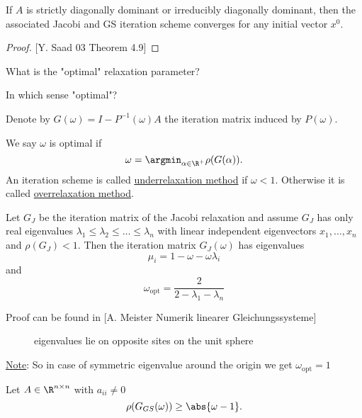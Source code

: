 \begin{theorem}
\label{thm:theorem2.3}
	If $A$ is strictly diagonally dominant or irreducibly diagonally dominant, then the associated Jacobi and GS iteration scheme converges for any initial vector $x^{0}$.
\end{theorem}

\begin{proof}
\label{thm:theorem2.3proof}
	[Y. Saad 03 Theorem 4.9]
\end{proof}

What is the "optimal" relaxation parameter?

In which sense "optimal"?

Denote by $G(\omega )=I-P^{-1}(\omega )A$ the iteration matrix induced by $P(\omega )$.

We say $\omega $ is optimal if
\[
	\omega  = \argmin_{\alpha \in \R^{+}} \rho(G(\alpha ))
.\] 
An iteration scheme is called \underline{underrelaxation method} if $\omega  < 1$. Otherwise it is called \underline{overrelaxation method}.

\begin{theorem}
\label{thm:theorem2.4}
Let $G_{J}$ be the iteration matrix of the Jacobi relaxation and assume	$G_{J}$ has only real eigenvalues $\lambda_1 \leq \lambda_2 \leq \ldots \leq \lambda_{n}$ with linear independent eigenvectors $x_1, \ldots , x_{n}$ and $\rho(G_{J}) < 1$. Then the iteration matrix $G_{J}(\omega )$ has eigenvalues
\[
\mu _{i} =  1 - \omega - \omega \lambda _{i}
\] 
and 
\[
\omega _{\text{opt}} = \frac{2}{2-\lambda_1-\lambda _{n}}
\] 

Proof can be found in [A. Meister Numerik linearer Gleichungssysteme]
\end{theorem}

\begin{figure}[H]
	\begin{center}
		
	\end{center}
	\caption{eigenvalues lie on opposite sites on the unit sphere}
	\label{fig:eigenwerte}
\end{figure}


\underline{Note}: So in case of symmetric eigenvalue around the origin we get $\omega _{\text{opt}}=1$

\begin{theorem}
\label{thm:theorem2.5}
	Let $A \in \R^{n \times n}$ with $a_{ii} \neq 0$
	\[
		\rho(G_{GS}(\omega )) \geq \abs{\omega -1} 
	.\] 
\end{theorem}

